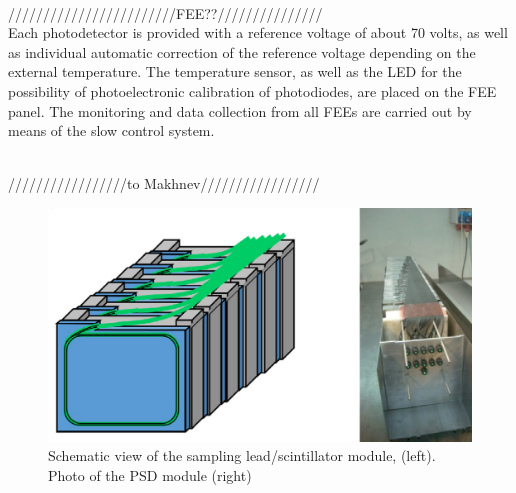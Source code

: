 \documentclass[a4paper,11pt]{article}
\begin{document}
\\////////////////////////FEE??///////////////\\

Each photodetector is provided with a reference voltage of about 70 volts, as well as individual automatic correction of the reference voltage depending on the external temperature. The temperature sensor, as well as the LED for the possibility of photoelectronic calibration of photodiodes, are placed on the FEE panel. The monitoring and data collection from all FEEs are carried out by means of the slow control system.

\\/////////////////to Makhnev/////////////////\\

\begin{figure}[htbp]
\centering 
\includegraphics[width=.45\textwidth]{PSD_module.png}
\caption{\label{fig:1} Schematic view of the sampling lead/scintillator module, (left). Photo of the PSD module (right)}
\end{figure}
\end{document}
